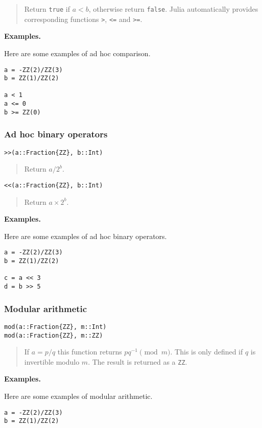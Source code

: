 \documentclass[a4paper,10pt]{article}
\newcommand{\code}{\lstinline}
\newcommand{\desc}[1]{\vspace{-3mm}\begin{quote}#1\end{quote}}
\begin{document}
{{\desc{Return \code{true} if $a < b$, otherwise return \code{false}. Julia
automatically provides corresponding functions \code{>}, \code{<=} and
\code{>=}.}

\textbf{Examples.}

Here are some examples of ad hoc comparison.

\begin{lstlisting}
a = -ZZ(2)/ZZ(3)
b = ZZ(1)/ZZ(2)

a < 1
a <= 0
b >= ZZ(0)
\end{lstlisting}

\subsubsection{Ad hoc binary operators}

\begin{lstlisting}
>>(a::Fraction{ZZ}, b::Int)
\end{lstlisting}

\desc{Return $a/2^b$.}

\begin{lstlisting}
<<(a::Fraction{ZZ}, b::Int)
\end{lstlisting}

\desc{Return $a\times 2^b$.}

\textbf{Examples.}

Here are some examples of ad hoc binary operators.

\begin{lstlisting}
a = -ZZ(2)/ZZ(3)
b = ZZ(1)/ZZ(2)

c = a << 3
d = b >> 5
\end{lstlisting}

\subsubsection{Modular arithmetic}

\begin{lstlisting}
mod(a::Fraction{ZZ}, m::Int)
mod(a::Fraction{ZZ}, m::ZZ)
\end{lstlisting}

\desc{If $a = p/q$ this function returns $pq^{-1} \pmod{m}$. This is only
defined if $q$ is invertible modulo $m$. The result is returned as a \code{ZZ}.}

\textbf{Examples.}

Here are some examples of modular arithmetic.

\begin{lstlisting}
a = -ZZ(2)/ZZ(3)
b = ZZ(1)/ZZ(2)


\end{lstlisting}}}
\end{document}
